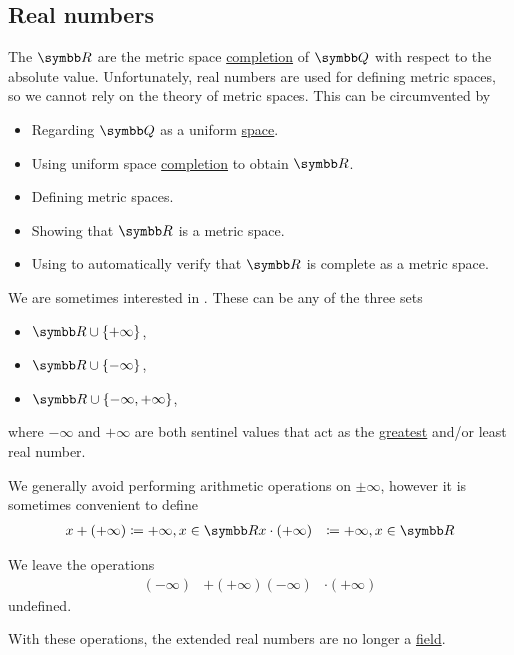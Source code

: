 \subsection{Real numbers}\label{subsec:real_numbers}

\begin{definition}\label{def:real_numbers}
  The  \( \BR \) are the metric space \hyperref[def:complete_metric_space]{completion} of \( \BQ \) with respect to the absolute value. Unfortunately, real numbers are used for defining metric spaces, so we cannot rely on the theory of metric spaces. This can be circumvented by
  \begin{itemize}
    \item Regarding \( \BQ \) as a uniform \hyperref[def:uniform_space]{space}.
    \item Using uniform space \hyperref[thm:uniform_space_completion]{completion} to obtain \( \BR \).
    \item Defining metric spaces.
    \item Showing that \( \BR \) is a metric space.
    \item Using  to automatically verify that \( \BR \) is complete as a metric space.
  \end{itemize}
\end{definition}

\begin{definition}\label{def:extended_real_numbers}
  We are sometimes interested in . These can be any of the three sets
  \begin{itemize}
    \item \( \BR \cup \{ +\infty \} \),
    \item \( \BR \cup \{ -\infty \} \),
    \item \( \BR \cup \{ -\infty, +\infty \} \),
  \end{itemize}
  where \( -\infty \) and \( +\infty \) are both sentinel values that act as the \hyperref[def:preordered_set/largest_smallest_element]{greatest} and/or least real number.

  We generally avoid performing arithmetic operations on \( \pm \infty \), however it is sometimes convenient to define
  \begin{align*}
    x + (+\infty) &\coloneqq +\infty, x \in \BR
    x \cdot (+\infty) &\coloneqq +\infty, x \in \BR
  \end{align*}

  We leave the operations
  \begin{align*}
    (-\infty) &+ (+\infty)
    (-\infty) &\cdot (+\infty)
  \end{align*}
  undefined.

  With these operations, the extended real numbers are no longer a \hyperref[def:field]{field}.
\end{definition}

